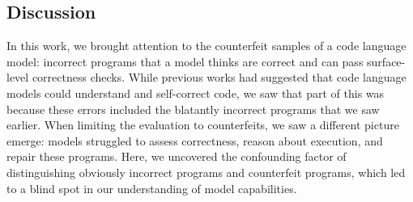 



\subsection{Discussion}
In this work, we brought attention to the counterfeit samples of a code language model: incorrect
programs that a model thinks are correct and can pass surface-level correctness checks. While previous
works had suggested that code language models could understand and self-correct code, we saw that
part of this was because these errors included the blatantly incorrect programs that we saw earlier.
When limiting the evaluation to counterfeits, we saw a different picture emerge: models struggled to
assess correctness, reason about execution, and repair these programs. Here, we uncovered the confounding factor of distinguishing obviously incorrect programs and counterfeit programs,
which led to a blind spot in our understanding of model capabilities.

\label{subsec:counterfeit-discussion}
